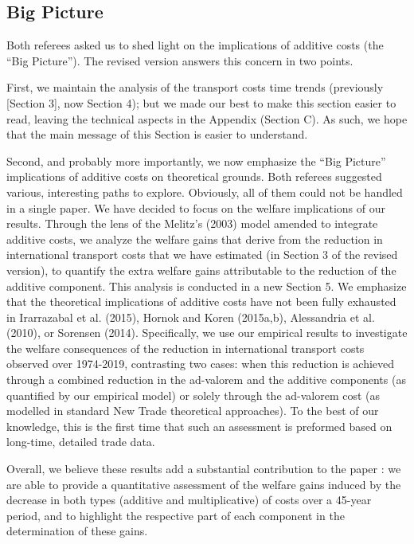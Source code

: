 \documentclass[12pt]{article}
\begin{document}
\subsection{Big Picture}
Both referees asked us to shed light on the implications of additive costs (the ``Big Picture''). The revised version answers this concern in two points. \medskip

First, we maintain the analysis of the transport costs time trends (previously [Section 3], now Section 4); but we made our best to make this section easier to read, leaving the technical aspects in the Appendix (Section C). As such, we hope that the main message of this Section is easier to understand. \medskip

Second, and probably more importantly, we now emphasize the ``Big Picture'' implications of additive costs on theoretical grounds. Both referees suggested various, interesting paths to explore. Obviously, all of them could not be handled in a single paper. We have decided to focus on the welfare implications of our results.  Through the lens of the Melitz's (2003) model amended to integrate additive costs, we analyze the welfare gains that derive from the reduction in international transport costs that we have estimated (in Section 3 of the revised version), to quantify the extra welfare gains attributable to the reduction of the additive component. This analysis is conducted in a new Section 5. We emphasize that the theoretical implications of additive costs have not been fully exhausted in Irarrazabal et al. (2015), Hornok and Koren (2015a,b), Alessandria et al. (2010), or Sorensen (2014). Specifically, we use our empirical results to investigate the welfare consequences of the reduction in international transport costs observed over 1974-2019, contrasting two cases: when this reduction is achieved through a combined reduction in the ad-valorem and the additive components (as quantified by our empirical model) or solely through the ad-valorem cost (as modelled in standard New Trade theoretical approaches). To the best of our knowledge, this is the first time that such an assessment is preformed based on long-time, detailed trade data.
\medskip

Overall, we believe these results add a substantial contribution to the paper : we are able to provide a quantitative assessment of the welfare gains induced by the decrease in both types (additive and multiplicative) of costs over a 45-year period, and to highlight the respective part of each component in the determination of these gains. %
   
\end{document}

